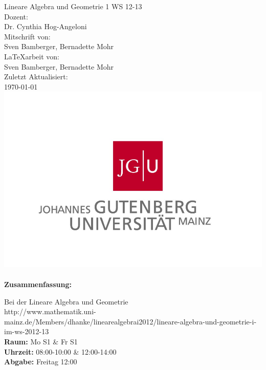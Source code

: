 \begin{titlepage}
\center
\Large Lineare Algebra und Geometrie 1 WS 12-13\large \\[2em]
Dozent:\\Dr. Cynthia Hog-Angeloni\\[2em]
Mitschrift von:\\Sven Bamberger, Bernadette Mohr\\[2em]
\LaTeX{arbeit} von:\\Sven Bamberger, Bernadette Mohr\\[2em]
Zuletzt Aktualisiert:\\\today\\
\includegraphics[scale=.2]{front/pics/Logo.jpg}\\\quad\\
\Large \textbf{Zusammenfassung:}\\[1em]
\parbox{0.75\textwidth}{\large
Bei der Lineare Algebra und Geometrie\\
http://www.mathematik.uni-mainz.de/Members/dhanke/linearealgebrai2012/lineare-algebra-und-geometrie-i-im-ws-2012-13\
\\
\textbf{Raum:} Mo S1 \& Fr S1\\
\textbf{Uhrzeit:} 08:00-10:00 \& 12:00-14:00\\
\textbf{Abgabe:} Freitag 12:00\\
}
\end{titlepage}
